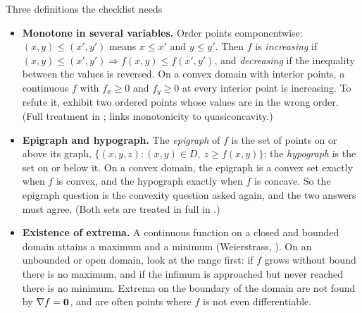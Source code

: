 \begin{rulebox}{Three definitions the checklist needs}
\begin{itemize}[leftmargin=1.6em,itemsep=0.3ex]
  \item \textbf{Monotone in several variables.} Order points componentwise:
        $(x,y)\le(x',y')$ means $x\le x'$ and $y\le y'$. Then $f$ is
        \emph{increasing}  if
        $(x,y)\le(x',y')\Rightarrow f(x,y)\le f(x',y')$, and
        \emph{decreasing} if the inequality between the values is reversed.
        On a convex domain with interior points, a continuous $f$ with
        $f_{x}\ge0$ and $f_{y}\ge0$ at every interior point is increasing.
        To refute it, exhibit two ordered points whose values are in the
        wrong order. (Full treatment in ;
         links monotonicity to quasiconcavity.)
  \item \textbf{Epigraph and hypograph.} The \emph{epigraph}
         of $f$ is the set of points on or above its graph,
        $\{(x,y,z): (x,y)\in D,\ z\ge f(x,y)\}$; the \emph{hypograph} is
        the set on or below it. On a convex domain, the epigraph is a convex
        set exactly when $f$ is convex, and the hypograph exactly when $f$
        is concave. So the epigraph question is the convexity question
        asked again, and the two answers must agree. (Both sets are treated
        in full in .)
  \item \textbf{Existence of extrema.} A continuous function on a closed
        and bounded domain attains a maximum and a minimum (Weierstrass,
        ). On an unbounded or open domain, look at the range
        first: if $f$ grows without bound there is no maximum, and if the
        infimum is approached but never reached there is no minimum.
        Extrema on the boundary of the domain are not found by
        $\nabla f=\mathbf{0}$, and are often points where $f$ is not even
        differentiable.
\end{itemize}
\end{rulebox}

